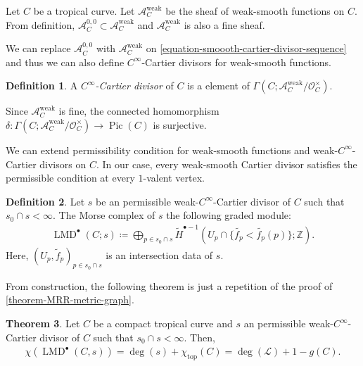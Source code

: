 \documentclass[a4paper,dvipdfmx,reqno,12pt]{amsart}
\theoremstyle{definition}
\newtheorem{theorem}{Theorem}[section]
\newtheorem{definition}[theorem]{Definition}
\newcommand{\deq}{\coloneqq}
\newcommand{\opn}[1]{\operatorname{#1}}
\numberwithin{equation}{section}
\begin{document}
Let $C$ be a tropical curve. 
Let $\mathcal{A}_C^{\opn{weak}}$ be the sheaf 
of weak-smooth functions on $C$. From definition,
$\mathcal{A}_C^{0,0}\subset \mathcal{A}_C^{\opn{weak}}$
and $\mathcal{A}_C^{\opn{weak}}$ is also a fine sheaf.

We can replace $\mathcal{A}_C^{0,0}$ with 
$\mathcal{A}_C^{\opn{weak}}$
on \cref{equation-smoooth-cartier-divisor-sequence}
and thus we can also define $C^{\infty}$-Cartier divisors
for weak-smooth functions. 
\begin{definition}
A \emph{$C^{\infty}$-Cartier divisor} of $C$ is a 
element of $\Gamma(C;\mathcal{A}_C^{\opn{weak}}/
\mathcal{O}^{\times}_C)$.
\end{definition}

Since $\mathcal{A}_C^{\opn{weak}}$ is fine, 
the connected homomorphism 
$\delta\colon \Gamma(C;\mathcal{A}_C^{\opn{weak}}/
\mathcal{O}^{\times}_C)\to \opn{Pic}(C)$ is 
surjective.


We can extend permissibility condition for
weak-smooth functions and weak-$C^{\infty}$-Cartier 
divisors on $C$. In our case, every weak-smooth 
Cartier divisor satisfies the permissible condition 
at every $1$-valent vertex.
\begin{definition}
Let $s$ be an permissible weak-$C^{\infty}$-Cartier divisor 
of $C$ such that $s_0\cap s<\infty$.
The Morse complex of $s$ the following graded module:
\begin{align}
  \opn{LMD}^{\bullet}(C;s)\deq \bigoplus_{p\in s_0\cap s} 
\tilde{H}^{\bullet-1}
(U_p\cap \{\tilde{f_p}<\tilde{f_p}(p)\};\mathbb{Z}).
\end{align}
Here, $(U_p,\tilde{f}_p)_{p\in s_0\cap s}$ is an
intersection data of $s$.
\end{definition}

From construction, the following theorem is just a
repetition of the proof of 
\cref{theorem-MRR-metric-graph}.

\begin{theorem} \label{theorem-MRR-tropical-curve}
Let $C$ be a compact tropical curve and 
$s$ an permissible weak-$C^{\infty}$-Cartier divisor 
of $C$ such that $s_0\cap s<\infty$. Then,
\begin{align}
  \chi(\opn{LMD}^{\bullet}(C,s))=\opn{deg}(s)+
\chi_{\opn{top}}(C)=\opn{deg}(\mathcal{L})+1-g(C).
\end{align}
\end{theorem}
\end{document}
